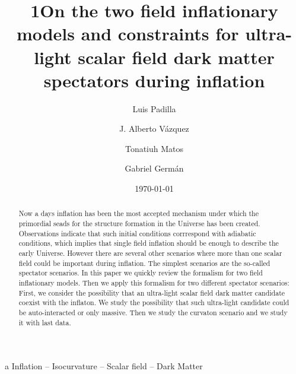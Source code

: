 \documentclass[amssymb,twocolumn,prd,nofootinbib,showpacs]{revtex4-1}
\begin{document}
\title{1On the two field inflationary models and constraints for ultra-light scalar field dark matter spectators during inflation}
\author{Luis Padilla}  
   \author{J. Alberto V\'azquez}  
\author{Tonatiuh Matos}  
   \author{Gabriel Germ\'an}  

\date{\today}

\begin{abstract}
Now a days inflation has been the most accepted mechanism under which the primordial seads for the structure formation in the Universe has been created. Observations indicate that such initial conditions corrrespond with adiabatic conditions, which implies that single field inflation should be enough to describe the early Universe. However there are several other scenarios where more than one scalar field could be important during inflation. The simplest scenarios are the so-called spectator scenarios. In this paper we quickly review the formalism for two field inflationary models. Then we apply this formalism for two different spectator scenarios: First, we consider the possibility that an ultra-light scalar field dark matter candidate coexist with the inflaton. We study the possibility that such ultra-light candidate could be auto-interacted or only massive. Then we study the curvaton scenario and we study it with last data.    

\end{abstract}
\begin{keywords}
a Inflation  --  Isocurvature  --  Scalar field -- Dark Matter
\end{keywords}

\maketitle
\end{document}
